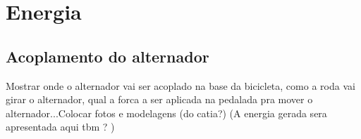 \chapter{Energia}
\label{energia}


\section{Acoplamento do alternador}
Mostrar onde o alternador vai ser acoplado na base da bicicleta, como a roda vai girar o alternador, qual a forca a ser aplicada na pedalada pra mover o alternador...Colocar fotos e modelagens (do catia?)
(A energia gerada sera apresentada aqui tbm ? )







